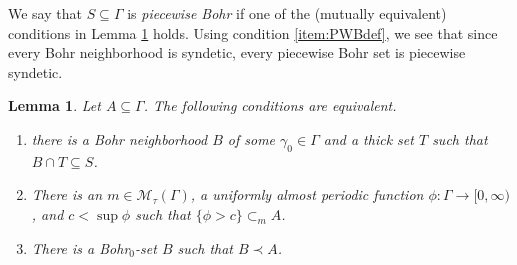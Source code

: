 \documentclass[12pt]{amsart} \usepackage{amsmath,centernot,amssymb,leftindex}
\newtheorem{lemma}[theorem]{Lemma}
\numberwithin{theorem}{section}
\numberwithin{equation}{section}
\theoremstyle{definition}
\begin{document}
		We say that $S\subseteq \Gamma$ is \emph{piecewise Bohr} if one of the (mutually equivalent) conditions in Lemma \ref{lem:PWBohrEquivalents} holds. 	
		  Using condition \ref{item:PWBdef}, we see that since every Bohr neighborhood is syndetic, every piecewise Bohr set is piecewise syndetic.   
	
	\begin{lemma}\label{lem:PWBohrEquivalents}
		Let $A\subseteq \Gamma$.  The following conditions are equivalent.
		
		\begin{enumerate}
			\item\label{item:PWBdef} there is a Bohr neighborhood $B$ of some $\gamma_{0}\in \Gamma$ and a thick set $T$ such that $B\cap T \subseteq S$.
			\item\label{item:PWBmean} There is an $m\in \mathcal M_{\tau}(\Gamma)$, a uniformly almost periodic function $\phi:\Gamma\to [0,\infty)$, and $c<\sup \phi$ such that $\{\phi>c\}\subset_m A$.
			\item\label{item:PWBprec} There is a Bohr$_0$-set $B$ such that $B\prec A$.
		\end{enumerate}
	\end{lemma}
	
\end{document}
